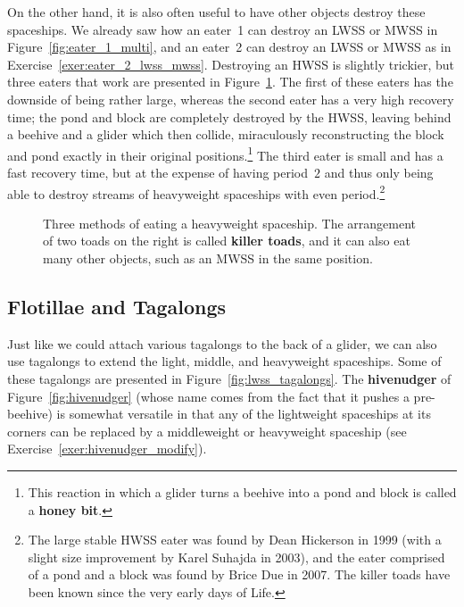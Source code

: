 On the other hand, it is also often useful to have other objects destroy these spaceships. We already saw how an eater~1 can destroy an LWSS or MWSS in Figure~\ref{fig:eater_1_multi}, and an eater~2 can destroy an LWSS or MWSS as in Exercise~\ref{exer:eater_2_lwss_mwss}. Destroying an HWSS is slightly trickier, but three eaters that work are presented in Figure~\ref{fig:hwss_eat}. The first of these eaters has the downside of being rather large, whereas the second eater has a very high recovery time; the pond and block are completely destroyed by the HWSS, leaving behind a beehive and a glider which then collide, miraculously reconstructing the block and pond exactly in their original positions.\footnote{This reaction in which a glider turns a beehive into a pond and block is called a \textbf{honey bit}.} The third eater is small and has a fast recovery time, but at the expense of having period~$2$ and thus only being able to destroy streams of heavyweight spaceships with even period.\footnote{The large stable HWSS eater was found by Dean Hickerson in 1999 (with a slight size improvement by Karel Suhajda in 2003), and the eater comprised of a pond and a block was found by Brice Due in 2007. The killer toads have been known since the very early days of Life.}

\begin{figure}[!htb]
	\centering {} \qquad {} \qquad {}
	\caption{Three methods of eating a heavyweight spaceship. The arrangement of two toads on the right is called \textbf{killer toads}, and it can also eat many other objects, such as an MWSS in the same position.}\label{fig:hwss_eat}
\end{figure}


\subsection{Flotillae and Tagalongs}\label{sec:flotillas}

Just like we could attach various tagalongs to the back of a glider, we can also use tagalongs to extend the light, middle, and heavyweight spaceships. Some of these tagalongs are presented in Figure~\ref{fig:lwss_tagalongs}. The \textbf{hivenudger} of Figure~\ref{fig:hivenudger} (whose name comes from the fact that it pushes a pre-beehive) is somewhat versatile in that any of the lightweight spaceships at its corners can be replaced by a middleweight or heavyweight spaceship (see Exercise~\ref{exer:hivenudger_modify}).

